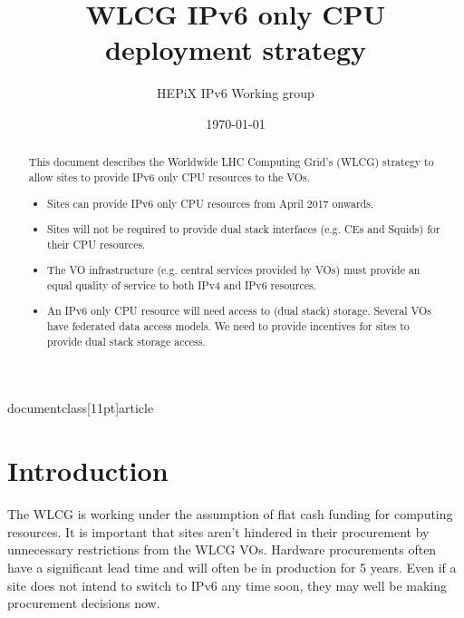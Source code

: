 documentclass[11pt]{article}


\title{WLCG IPv6 only CPU deployment strategy}
\author{HEPiX IPv6 Working group}
\date{\today}
\maketitle

\renewcommand{\abstractname}{Executive Summary}
\begin{abstract}
This document describes the Worldwide LHC Computing Grid's (WLCG) strategy to allow sites to provide IPv6 only CPU resources to the VOs.  


\begin{itemize}
\item Sites can provide IPv6 only CPU resources from April 2017 onwards.

\item Sites will not be required to provide dual stack interfaces (e.g. CEs and Squids) for their CPU resources.

\item The VO infrastructure (e.g. central services provided by VOs) must provide an equal quality of service to both IPv4 and IPv6 resources.

\item An IPv6 only CPU resource will need access to (dual stack) storage.  Several VOs have federated data access models.  We need to provide incentives for sites to provide dual stack storage access.  

\end{itemize}


\end{abstract}

\newpage
\tableofcontents
\newpage

\section{Introduction}
The WLCG is working under the assumption of flat cash funding for computing resources.  It is important that sites aren't hindered in their procurement by unnecessary restrictions from the WLCG VOs.  Hardware procurements often have a significant lead time and will often be in production for 5 years.  Even if a site does not intend to switch to IPv6 any time soon, they may well be making procurement decisions now.  

